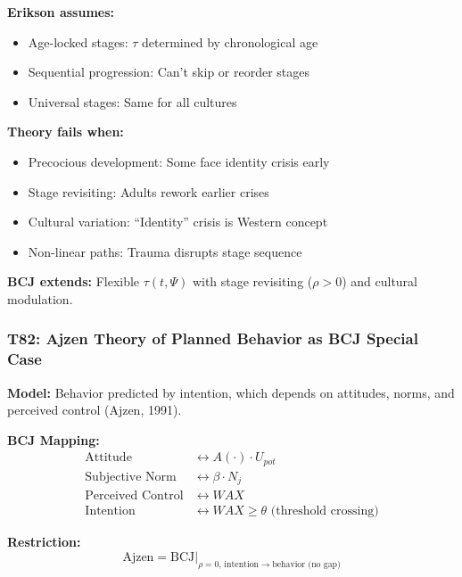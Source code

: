 \begin{tcolorbox}[colback=red!5!white, colframe=red!75!black,
    title=Boundary Condition: Where Erikson Fails]
\textbf{Erikson assumes:}
\begin{itemize}[nosep]
\item Age-locked stages: $\tau$ determined by chronological age
\item Sequential progression: Can't skip or reorder stages
\item Universal stages: Same for all cultures
\end{itemize}

\textbf{Theory fails when:}
\begin{itemize}[nosep]
\item Precocious development: Some face identity crisis early
\item Stage revisiting: Adults rework earlier crises
\item Cultural variation: ``Identity'' crisis is Western concept
\item Non-linear paths: Trauma disrupts stage sequence
\end{itemize}

\textbf{BCJ extends:} Flexible $\tau(t, \Psi)$ with stage revisiting ($\rho > 0$) and cultural modulation.
\end{tcolorbox}

\subsubsection*{T82: Ajzen Theory of Planned Behavior as BCJ Special Case}

\textbf{Model:} Behavior predicted by intention, which depends on attitudes, norms, and perceived control (Ajzen, 1991).

\textbf{BCJ Mapping:}
\begin{align}
\text{Attitude} &\leftrightarrow A(\cdot) \cdot U_{pot} \\
\text{Subjective Norm} &\leftrightarrow \beta \cdot N_j \\
\text{Perceived Control} &\leftrightarrow WAX \\
\text{Intention} &\leftrightarrow WAX \geq \theta \text{ (threshold crossing)}
\end{align}

\textbf{Restriction:}
\begin{equation}
\text{Ajzen} = \text{BCJ} \big|_{\rho = 0, \, \text{intention} \to \text{behavior (no gap)}}
\end{equation}

